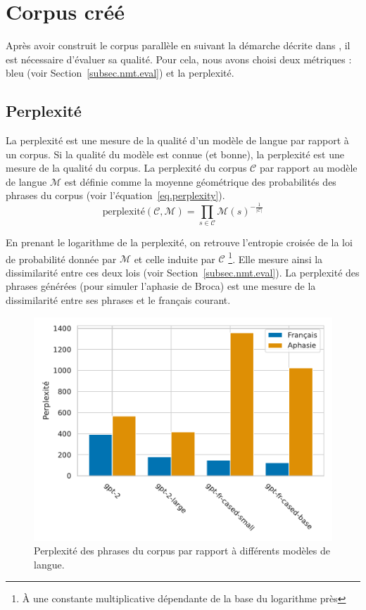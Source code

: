 \section{Corpus créé}%
\label{sec.results.corpus}

Après avoir construit le corpus parallèle en suivant la démarche décrite dans 
,
il est nécessaire d'évaluer sa qualité.
Pour cela, nous avons choisi deux métriques : \gls{bleu} (voir Section~\ref{subsec.nmt.eval})
et la perplexité.

\subsection{Perplexité}%
\label{subsec.results.corpus.perplexity}

La perplexité est une mesure de la qualité d'un modèle de langue par rapport à un corpus.
Si la qualité du modèle est connue (et bonne), la perplexité est une mesure de la qualité du corpus.
La perplexité du corpus \(\mathcal{C}\) par rapport au modèle de langue \(\mathcal{M}\) est définie
comme la moyenne géométrique des probabilités des phrases du corpus (voir l'équation~\ref{eq.perplexity}).
\begin{equation}
  \label{eq.perplexity}
  \text{perplexité}(\mathcal{C}, \mathcal{M}) = 
  \prod_{s\in\mathcal{C}}\mathcal{M}(s)^{-\frac{1}{|\mathcal{C}|}}
\end{equation}

En prenant le logarithme de la perplexité, 
on retrouve l'entropie croisée de la loi de probabilité donnée par \(\mathcal{M}\) 
et celle induite par \(\mathcal{C}\)%
\footnote{À une constante multiplicative dépendante de la base du logarithme près}.
Elle mesure ainsi la dissimilarité entre ces deux lois (voir Section~\ref{subsec.nmt.eval}).
La perplexité des phrases générées (pour simuler l'aphasie de Broca) 
est une mesure de la dissimilarité entre ses phrases et le français courant.


\begin{figure}[hbt]
  \begin{center}
    \includegraphics[width=.8\textwidth]{assets/python/perplexity.pdf}
  \end{center}
  \caption{Perplexité des phrases du corpus par rapport à différents modèles de langue.}
  \label{fig.perplexity}
\end{figure}

